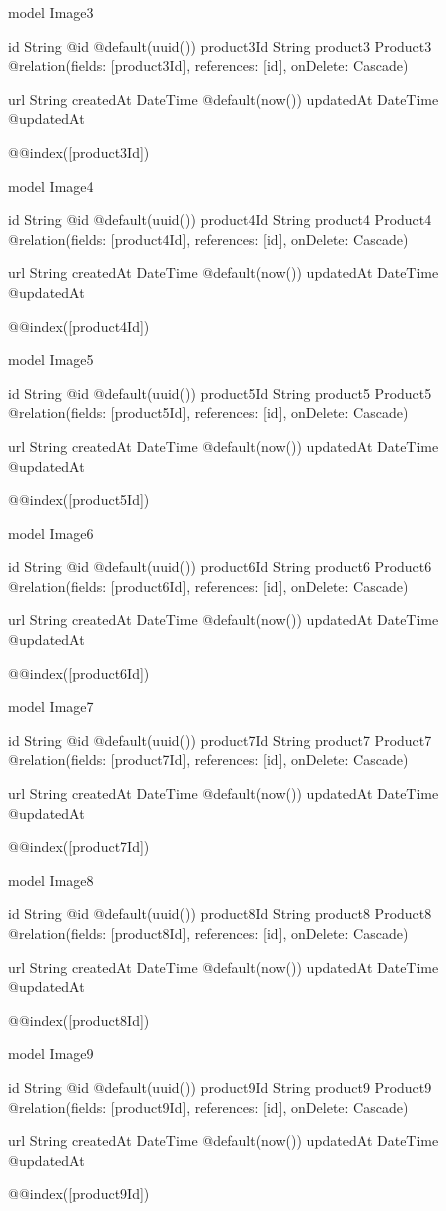 model Image3 {
  id         String   @id @default(uuid())
  product3Id String
  product3   Product3 @relation(fields: [product3Id], references: [id], onDelete: Cascade)

  url       String
  createdAt DateTime @default(now())
  updatedAt DateTime @updatedAt

  @@index([product3Id])
}

model Image4 {
  id         String   @id @default(uuid())
  product4Id String
  product4   Product4 @relation(fields: [product4Id], references: [id], onDelete: Cascade)

  url       String
  createdAt DateTime @default(now())
  updatedAt DateTime @updatedAt

  @@index([product4Id])
}

model Image5 {
  id         String   @id @default(uuid())
  product5Id String
  product5   Product5 @relation(fields: [product5Id], references: [id], onDelete: Cascade)

  url       String
  createdAt DateTime @default(now())
  updatedAt DateTime @updatedAt

  @@index([product5Id])
}

model Image6 {
  id         String   @id @default(uuid())
  product6Id String
  product6   Product6 @relation(fields: [product6Id], references: [id], onDelete: Cascade)

  url       String
  createdAt DateTime @default(now())
  updatedAt DateTime @updatedAt

  @@index([product6Id])
}

model Image7 {
  id         String   @id @default(uuid())
  product7Id String
  product7   Product7 @relation(fields: [product7Id], references: [id], onDelete: Cascade)

  url       String
  createdAt DateTime @default(now())
  updatedAt DateTime @updatedAt

  @@index([product7Id])
}

model Image8 {
  id         String   @id @default(uuid())
  product8Id String
  product8   Product8 @relation(fields: [product8Id], references: [id], onDelete: Cascade)

  url       String
  createdAt DateTime @default(now())
  updatedAt DateTime @updatedAt

  @@index([product8Id])
}

model Image9 {
  id         String   @id @default(uuid())
  product9Id String
  product9   Product9 @relation(fields: [product9Id], references: [id], onDelete: Cascade)

  url       String
  createdAt DateTime @default(now())
  updatedAt DateTime @updatedAt

  @@index([product9Id])
}

